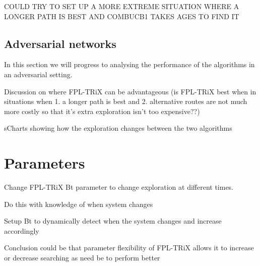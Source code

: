 COULD TRY TO SET UP A MORE EXTREME SITUATION WHERE A LONGER PATH IS BEST AND COMBUCB1 TAKES AGES TO FIND IT




\subsection{Adversarial networks}

In this section we will progress to analysing the performance of the algorithms in an adversarial setting. 

Discussion on where FPL-TRiX can be advantageous (is FPL-TRiX best when in situations when 1. a longer path is best and 2. alternative routes are not much more costly so that it's extra exploration isn't too expensive??)

sCharts showing how the exploration changes between the two algorithms


\pagebreak


\section{Parameters}

Change FPL-TRiX Bt parameter to change exploration at different times.

Do this with knowledge of when system changes

Setup Bt to dynamically detect when the system changes and increase accordingly


Conclusion could be that parameter flexibility of FPL-TRiX allows it to increase or decrease searching as need be to perform better

\pagebreak


\appendix %



%
%





